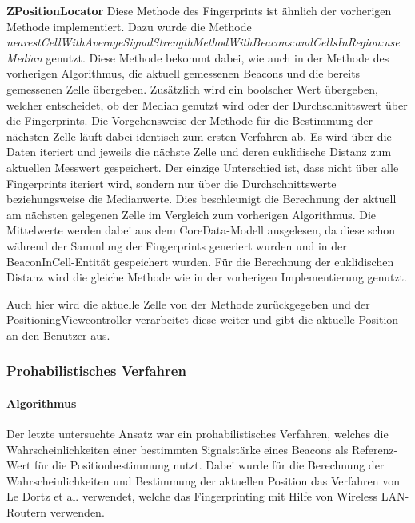 \textbf{ZPositionLocator}
Diese Methode des Fingerprints ist ähnlich der vorherigen Methode implementiert. Dazu wurde die Methode \emph{nearestCellWithAverageSignalStrengthMethodWithBeacons:andCellsInRegion:useMedian} genutzt. Diese Methode bekommt dabei, wie auch in der Methode des vorherigen Algorithmus, die aktuell gemessenen Beacons und die bereits gemessenen Zelle übergeben. Zusätzlich wird ein boolscher Wert übergeben, welcher entscheidet, ob der Median genutzt wird oder der Durchschnittswert über die Fingerprints.
Die Vorgehensweise der Methode für die Bestimmung der nächsten Zelle läuft dabei identisch zum ersten Verfahren ab. Es wird über die Daten iteriert und jeweils die nächste Zelle und deren euklidische Distanz zum aktuellen Messwert gespeichert. Der einzige Unterschied ist, dass nicht über alle Fingerprints iteriert wird, sondern nur über die Durchschnittswerte beziehungsweise die Medianwerte. Dies beschleunigt die Berechnung der aktuell am nächsten gelegenen Zelle im Vergleich zum vorherigen Algorithmus. 
Die Mittelwerte werden dabei aus dem CoreData-Modell ausgelesen, da diese schon während der Sammlung der Fingerprints generiert wurden und in der BeaconInCell-Entität gespeichert wurden. 
Für die Berechnung der euklidischen Distanz wird die gleiche Methode wie in der vorherigen Implementierung genutzt.

Auch hier wird die aktuelle Zelle von der Methode zurückgegeben und der PositioningViewcontroller verarbeitet diese weiter und gibt die aktuelle Position an den Benutzer aus.

\subsubsection{Prohabilistisches Verfahren}
\label{sec:implementation:fingerprinting:positioning:probability}

\paragraph{Algorithmus}
\label{sec:implementation:fingerprinting:positioning:probability:algorithm}

Der letzte untersuchte Ansatz war ein prohabilistisches Verfahren, welches die Wahrscheinlichkeiten einer bestimmten Signalstärke eines Beacons als Referenz-Wert für die Positionbestimmung nutzt. Dabei wurde für die Berechnung der Wahrscheinlichkeiten und Bestimmung der aktuellen Position das Verfahren von Le Dortz et al. \cite{wifiFingerprintProbability} verwendet, welche das Fingerprinting mit Hilfe von Wireless LAN-Routern verwenden.

